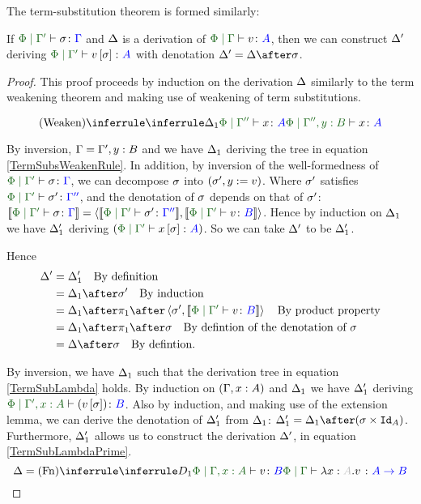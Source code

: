 \documentclass{Report}
\begin{document}
The term-substitution theorem is formed similarly: 

\begin{theorem}
    If $\etyperelation{\P}{\G'}{\si}{\G}$ and $\Delta$ is a derivation of $\gpetyperelation{v}{A}$, then we can construct $\Delta'$ deriving $\etyperelation{\P}{\G'}{v\ssi}{A}$ with denotation $\D' = \D \after \si$.
\end{theorem}


\begin{proof}
    This proof proceeds by induction on the derivation $\Delta$ similarly to the term weakening theorem and making use of weakening of term substitutions.




\begin{equation} \label{TermSubsWeakenRule}
    \ntreeruleI{Weaken}{\treeruleI{\D_1}{\etyperelation{\P}{\G''}{x}{A}}}{\etyperelation{\P}{\G'',y: B}{x}{A}}
\end{equation}

By inversion, $\Gamma = \Gamma', y:B$ and we have $\Delta_1$ deriving the tree in equation \ref{TermSubsWeakenRule}. In addition, by inversion of the well-formedness of $\etyperelation{\P}{\G'}{\si}{\G}$, we can decompose $\sigma$ into $(\sigma', y:= v)$. Where $\sigma'$ satisfies $\etyperelation{\P}{\G'}{\si'}{\G''}$, and the denotation of $\sigma$ depends on that of $\sigma'$: $\deno{\etyperelation{\P}{\G'}{\si}{\G}} = \pr{\deno{\etyperelation{\P}{\G'}{\si'}{\G''}}}{\deno{\etyperelation{\P}{\G'}{v}{B}}}$. Hence by induction on $\Delta_1$ we have $\Delta_1'$ deriving $(\etyperelation{\P}{\G'}{x\ssi}{A})$. So we can take $\Delta'$ to be $\Delta_1'$.

Hence
\begin{align*}
    \D' & = \D_1' \qt{By definition}\\
        & = \D_1\after\si'\qt{By induction}\\
        & = \D_1\after\p\after\pr{\si'}{\deno{\etyperelation{\P}{\G'}{v}{B}}}\qt{By product property}\\
        & = \D_1\after\p\after\si\qt{By defintion of the denotation of $\si$}\\
        & = \D\after\si\qt{By defintion.}
\end{align*}



By inversion, we have $\Delta_1$ such that the derivation tree in equation \ref{TermSubLambda} holds. By induction on $(\Gamma, x: A)$ and $\Delta_1$ we have $\Delta_1'$ deriving $\etyperelation{\P}{\G', x:A}{(v\ssi)}{B}$. Also by induction, and making use of the extension lemma, we can derive the denotation of $\Delta_1'$  from $\Delta_1$: $\D_1' = \D_1\after(\si\times\Id{A})$. Furthermore, $\Delta_1'$ allows us to construct the derivation $\Delta'$, in equation \ref{TermSubLambdaPrime}.
\begin{equation}\label{TermSubLambda}
    \D = \ntreeruleI{Fn}{
        \treeruleI{D_1}{\etyperelation{\P}{\G, x:A}{v}{B}}
    }{\etyperelation{\P}{\G}{\lam{x}{A}{v}}{\ab}}
\end{equation}



\end{proof}
\end{document}
